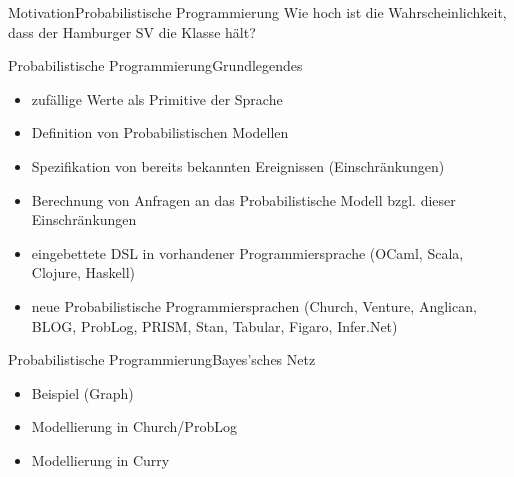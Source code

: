 \documentclass{beamer}
\begin{document}
%
%
%
\begin{frame}{Motivation}{Probabilistische Programmierung}
\center
\Large
Wie hoch ist die Wahrscheinlichkeit, dass der Hamburger SV die Klasse
h\"alt?
\end{frame}

\begin{frame}{Probabilistische Programmierung}{Grundlegendes}
\begin{itemize}
\item zuf\"allige Werte als Primitive der Sprache
\item Definition von Probabilistischen Modellen
\item Spezifikation von bereits bekannten Ereignissen (Einschr\"ankungen)
\item Berechnung von Anfragen an das Probabilistische Modell bzgl. dieser Einschr\"ankungen
\end{itemize}
\begin{itemize}
\item eingebettete DSL in vorhandener Programmiersprache (OCaml, Scala, Clojure, Haskell) 
\item neue Probabilistische Programmiersprachen (Church, Venture, Anglican, BLOG, ProbLog, PRISM, Stan, Tabular, Figaro, Infer.Net)
\end{itemize}
\end{frame}



\begin{frame}{Probabilistische Programmierung}{Bayes'sches Netz}

\begin{itemize}
\item Beispiel (Graph)
\item Modellierung in Church/ProbLog
\item Modellierung in Curry
\end{itemize}
\end{frame}
\end{document}
